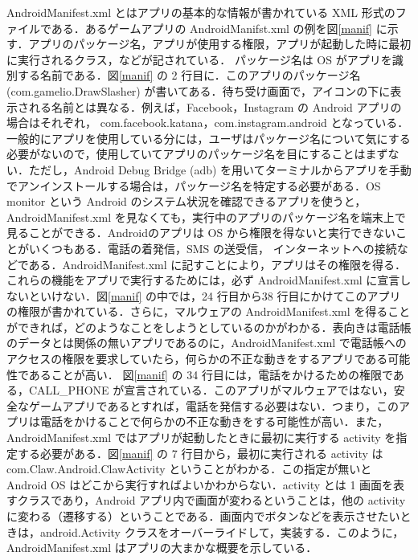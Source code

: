 AndroidManifest.xml とはアプリの基本的な情報が書かれている XML 形式のファイルである．あるゲームアプリの AndroidManifst.xml の例を図\ref{manif} に示す．アプリのパッケージ名，アプリが使用する権限，アプリが起動した時に最初に実行されるクラス，などが記されている． パッケージ名は OS がアプリを識別する名前である．図\ref{manif} の 2 行目に．このアプリのパッケージ名 (com.gamelio.DrawSlasher) が書いてある．待ち受け画面で，アイコンの下に表示される名前とは異なる．例えば，Facebook，Instagram の Android アプリの場合はそれぞれ， com.facebook.katana，com.instagram.android となっている．一般的にアプリを使用している分には，ユーザはパッケージ名について気にする必要がないので，使用していてアプリのパッケージ名を目にすることはまずない．ただし，Android Debug Bridge (adb) を用いてターミナルからアプリを手動でアンインストールする場合は，パッケージ名を特定する必要がある．OS monitor という Android のシステム状況を確認できるアプリを使うと，AndroidManifest.xml を見なくても，実行中のアプリのパッケージ名を端末上で見ることができる．Androidのアプリは OS から権限を得ないと実行できないことがいくつもある．電話の着発信，SMS の送受信， インターネットへの接続などである．AndroidManifest.xml に記すことにより，アプリはその権限を得る．これらの機能をアプリで実行するためには，必ず AndroidManifest.xml に宣言しないといけない．図\ref{manif} の中では，24 行目から38 行目にかけてこのアプリの権限が書かれている．さらに，マルウェアの AndroidManifest.xml を得ることができれば，どのようなことをしようとしているのかがわかる．表向きは電話帳のデータとは関係の無いアプリであるのに，AndroidManifest.xml で電話帳へのアクセスの権限を要求していたら，何らかの不正な動きをするアプリである可能性であることが高い． 図\ref{manif} の 34 行目には，電話をかけるための権限である，CALL\_PHONE が宣言されている．このアプリがマルウェアではない，安全なゲームアプリであるとすれば，電話を発信する必要はない．つまり，このアプリは電話をかけることで何らかの不正な動きをする可能性が高い．また，AndroidManifest.xml ではアプリが起動したときに最初に実行する activity を指定する必要がある．図\ref{manif} の 7 行目から，最初に実行される activity は com.Claw.Android.ClawActivity ということがわかる．この指定が無いと Android OS はどこから実行すればよいかわからない．activity とは 1 画面を表すクラスであり，Android アプリ内で画面が変わるということは，他の activity に変わる（遷移する）ということである．画面内でボタンなどを表示させたいときは，android.Activity クラスをオーバーライドして，実装する．このように，AndroidManifest.xml はアプリの大まかな概要を示している．

